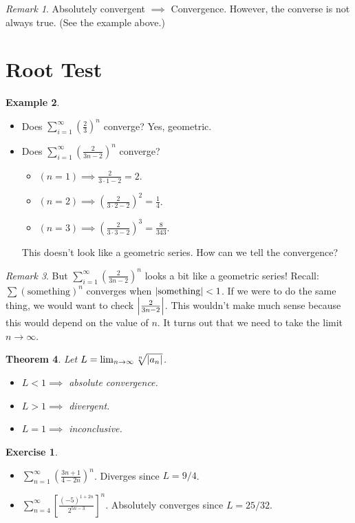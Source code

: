 \documentclass[12pt, psamsfonts]{amsart}
\newtheorem{thm}{Theorem}[section]
\theoremstyle{definition}
\newtheorem{exmp}[thm]{Example}
\newtheorem*{exer}{Exercise}
\theoremstyle{remark}
\newtheorem{rem}[thm]{Remark}
\numberwithin{equation}{section}
\begin{document}
\begin{rem}
  Absolutely convergent $\implies$ Convergence.
  However, the converse is not always true.
  (See the example above.)
\end{rem}

\section{Root Test}

\begin{exmp}
$ $
  \begin{itemize}
    \item
      Does $\sum_{i=1}^{\infty} (\frac{2}{3})^n$ converge?
      Yes, geometric.
    \item
      Does $\sum_{i=1}^{\infty} (\frac{2}{3n - 2})^n$ converge?
      \begin{itemize}
        \item
          $(n = 1) \implies \frac{2}{3 \cdot 1 - 2} = 2$.
        \item
          $(n = 2) \implies (\frac{2}{3 \cdot 2 - 2})^2= \frac{1}{4}$.
        \item
          $(n = 3) \implies (\frac{2}{3 \cdot 3 - 2})^3 = \frac{8}{343}$.
      \end{itemize}
      This doesn't look like a geometric series.
      How can we tell the convergence?
  \end{itemize}
\end{exmp}

\begin{rem}
  But $\sum_{i=1}^{\infty} (\frac{2}{3n - 2})^n$ looks a bit like a geometric series!
  Recall: $\sum (\text{something})^n$ converges when $\abs{\text{something}} < 1$.
  If we were to do the same thing, we would want to check $\abs{\frac{2}{3n - 2}}$.
  This wouldn't make much sense because this would depend on the value of $n$.
  It turns out that we need to take the limit $n \rightarrow \infty$.
\end{rem}

\begin{thm}
  Let $L = \lim_{n \rightarrow \infty} \sqrt[n]{\abs{a_n}}$.
  \begin{itemize}
    \item
      $L < 1 \implies$ absolute convergence.
    \item
      $L > 1 \implies$ divergent.
    \item
      $L = 1 \implies$ inconclusive.
  \end{itemize}
\end{thm}

\begin{exer}
$ $
  \begin{itemize}
    \item
      $\sum_{n=1}^{\infty} (\frac{3n + 1}{4 - 2n})^n$.
      Diverges since $L = 9/4$.
    \item
      $\sum_{n=4}^{\infty} [\frac{(-5)^{1 + 2n}}{2^{5n - 3}}]^n$.
      Absolutely converges since $L = 25/32$.
  \end{itemize}
\end{exer}
\end{document}
